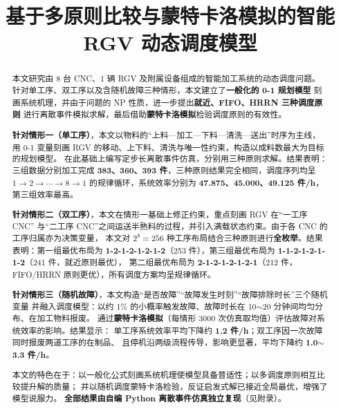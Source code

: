 \documentclass{cumcmthesis}
\title{基于多原则比较与蒙特卡洛模拟的智能 RGV 动态调度模型}
\begin{document}
\maketitle

\begin{abstract}
本文研究由 8 台 CNC、1 辆 RGV 及附属设备组成的智能加工系统的动态调度问题。
针对单工序、双工序以及含随机故障三种情形，本文建立了\textbf{一般化的 0-1 规划模型}
刻画系统机理，并由于问题的 NP 性质，进一步提出\textbf{就近、FIFO、HRRN 三种调度原则}
进行离散事件模拟求解，最后借助\textbf{蒙特卡洛模拟}检验调度原则的有效性。

\textbf{针对情形一（单工序）}，本文以物料的“上料—加工—下料—清洗—送出”时序为主线，
用 0-1 变量刻画 RGV 的移动、上下料、清洗与唯一性约束，构造以成料数最大为目标的规划模型。
在此基础上编写定步长离散事件仿真，分别用三种原则求解。结果表明：三组数据分别加工完成
\textbf{383、360、393 件}，三种原则结果完全相同，调度序列均呈 $1\to2\to\cdots\to8\to1$
的规律循环，系统效率分别为 \textbf{47.875、45.000、49.125 件/h}，第三组效率最高。

\textbf{针对情形二（双工序）}，本文在情形一基础上修正约束，重点刻画 RGV 在“一工序 CNC”
与“二工序 CNC”之间运送半熟料的过程，并引入满载状态约束。由于各 CNC 的工序归属亦为决策变量，
本文对 $2^8=256$ 种工序布局结合三种原则进行\textbf{全枚举}。结果表明：第一组最优布局为
\textbf{1-2-1-2-1-2-1-2}（253 件），第三组最优布局为 \textbf{1-1-2-1-2-1-1-2}（241 件，就近原则最优），
第二组最优布局为 \textbf{2-1-2-1-2-1-2-1}（212 件，FIFO/HRRN 原则更优），所有调度方案均呈规律循环。

\textbf{针对情形三（随机故障）}，本文构造“是否故障”“故障发生时刻”“故障排除时长”三个随机变量
并融入调度模型：以约 1\% 的小概率触发故障、故障时长在 10$\sim$20 分钟间均匀分布、在加工物料报废。
通过\textbf{蒙特卡洛模拟}（每情形 3000 次仿真取均值）评估故障对系统效率的影响。结果显示：
单工序系统效率平均下降约 \textbf{1.2 件/h}；双工序因一次故障同时报废两道工序的在制品、
且停机沿两级流程传导，影响更显著，平均下降约 \textbf{1.0$\sim$3.3 件/h}。

本文的特色在于：以一般化公式刻画系统机理使模型具备普适性；以多调度原则相互比较提升解的质量；
并以随机调度蒙特卡洛检验，反证启发式解已接近全局最优，增强了模型说服力。
\textbf{全部结果由自编 Python 离散事件仿真独立复现}（见附录）。

\end{abstract}

\end{document}
